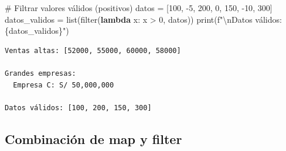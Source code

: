 \documentclass[
  doc,
  floatsintext,
  longtable,
  a4paper,
  nolmodern,
  notxfonts,
  notimes,
  12pt,
  colorlinks=true,linkcolor=blue,citecolor=blue,urlcolor=blue]{apa7}
\newenvironment{Shaded}{\begin{snugshade}}{\end{snugshade}}
\newcommand{\BuiltInTok}[1]{\textcolor[rgb]{0.00,0.23,0.31}{#1}}
\newcommand{\CharTok}[1]{\textcolor[rgb]{0.13,0.47,0.30}{#1}}
\newcommand{\CommentTok}[1]{\textcolor[rgb]{0.37,0.37,0.37}{#1}}
\newcommand{\DecValTok}[1]{\textcolor[rgb]{0.68,0.00,0.00}{#1}}
\newcommand{\KeywordTok}[1]{\textcolor[rgb]{0.00,0.23,0.31}{\textbf{#1}}}
\newcommand{\NormalTok}[1]{\textcolor[rgb]{0.00,0.23,0.31}{#1}}
\newcommand{\OperatorTok}[1]{\textcolor[rgb]{0.37,0.37,0.37}{#1}}
\newcommand{\SpecialCharTok}[1]{\textcolor[rgb]{0.37,0.37,0.37}{#1}}
\newcommand{\SpecialStringTok}[1]{\textcolor[rgb]{0.13,0.47,0.30}{#1}}
\begin{document}
\begin{Shaded}
\begin{Highlighting}[]
\CommentTok{\# Filtrar valores válidos (positivos)}
\NormalTok{datos }\OperatorTok{=}\NormalTok{ [}\DecValTok{100}\NormalTok{, }\OperatorTok{{-}}\DecValTok{5}\NormalTok{, }\DecValTok{200}\NormalTok{, }\DecValTok{0}\NormalTok{, }\DecValTok{150}\NormalTok{, }\OperatorTok{{-}}\DecValTok{10}\NormalTok{, }\DecValTok{300}\NormalTok{]}
\NormalTok{datos\_validos }\OperatorTok{=} \BuiltInTok{list}\NormalTok{(}\BuiltInTok{filter}\NormalTok{(}\KeywordTok{lambda}\NormalTok{ x: x }\OperatorTok{\textgreater{}} \DecValTok{0}\NormalTok{, datos))}
\BuiltInTok{print}\NormalTok{(}\SpecialStringTok{f"}\CharTok{\textbackslash{}n}\SpecialStringTok{Datos válidos: }\SpecialCharTok{\{}\NormalTok{datos\_validos}\SpecialCharTok{\}}\SpecialStringTok{"}\NormalTok{)}
\end{Highlighting}
\end{Shaded}

\begin{verbatim}
Ventas altas: [52000, 55000, 60000, 58000]

Grandes empresas:
  Empresa C: S/ 50,000,000

Datos válidos: [100, 200, 150, 300]
\end{verbatim}

\subsection{Combinación de map y
filter}\label{combinaciuxf3n-de-map-y-filter}
\end{document}
